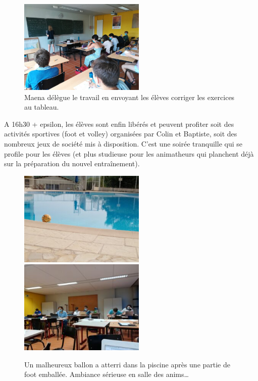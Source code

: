 \begin{figure}[H]
\centering\includegraphics[width=6cm]{CR-22-2.jpg}
\caption{Maena délègue le travail en envoyant les élèves corriger les exercices au tableau.}
\end{figure}

A 16h30 + epsilon, les élèves sont enfin libérés et peuvent profiter soit des activités sportives (foot et volley) organisées par Colin et Baptiste, soit des nombreux jeux de société mis à disposition. C’est une soirée tranquille qui se profile pour les élèves (et plus studieuse pour les animatheurs qui planchent déjà sur la préparation du nouvel entraînement).

\begin{figure}[H]
\centering\includegraphics[width=6cm]{CR-22-3.jpg}\hspace{2cm}\includegraphics[width=6cm]{CR-22-4.jpg}
\caption{Un malheureux ballon a atterri dans la piscine après une partie de foot emballée. Ambiance sérieuse en salle des anims…}
\end{figure}